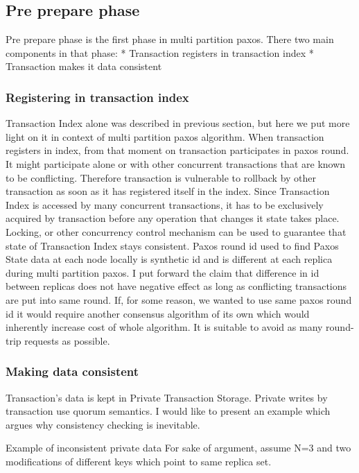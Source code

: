 \subsection{Pre prepare phase}
Pre prepare phase is the first phase in multi partition paxos. There two main components in that phase:
* Transaction registers in transaction index 
* Transaction makes it data consistent


\subsubsection{Registering in transaction index}
Transaction Index alone was described in previous section, but here we put more light on it in context of multi partition paxos algorithm. When transaction registers in index, from that moment on transaction participates in paxos round. It might participate alone or with other concurrent transactions that are known to be conflicting. Therefore transaction is vulnerable to rollback by other transaction as soon as it has registered itself in the index.
        Since Transaction Index is accessed by many concurrent transactions, it has to be exclusively acquired by transaction before any operation that changes it state takes place. Locking, or other concurrency control mechanism can be used to guarantee that state of Transaction Index stays consistent.
        Paxos round id used to find Paxos State data at each node locally is synthetic id and is different at each replica during multi partition paxos. I put forward the claim that difference in id between replicas does not have negative effect as long as conflicting transactions are put into same round. If, for some reason, we wanted to use same paxos round id it would require another consensus algorithm of its own which would inherently increase cost of whole algorithm. It is suitable to avoid as many round-trip requests as possible.
        
\subsubsection{Making data consistent}
Transaction’s data is kept in Private Transaction Storage. Private writes by transaction use quorum semantics. I would like to present an example which argues why consistency checking is inevitable.


Example of inconsistent private data
For sake of argument, assume N=3 and two modifications of different keys which point to same replica set.


